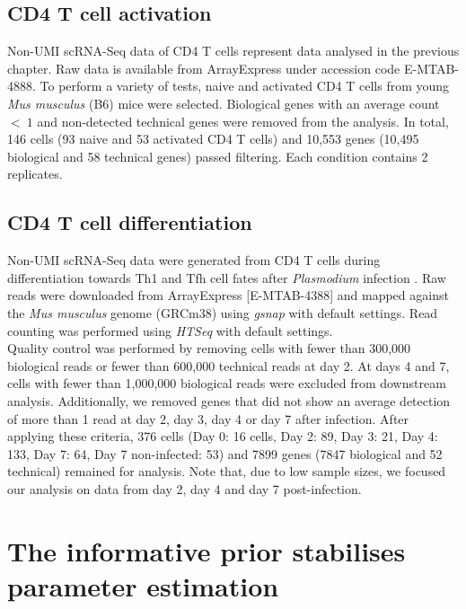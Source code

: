 \subsection{CD4\plus{} T cell activation} \label{seq::data_cd4}

Non-UMI scRNA-Seq data of CD4\plus{} T cells represent data analysed in  the previous chapter. 
Raw data is available from ArrayExpress under accession code E-MTAB-4888. To perform a variety of tests, naive and activated CD4\plus{} T cells from young \emph{Mus musculus} (B6) mice were selected. 
Biological genes with an average count $<~1$ and non-detected technical genes were removed from the analysis. 
In total, 146 cells (93 naive and 53 activated CD4\plus{} T cells) and 10,553 genes (10,495 biological and 58 technical genes) passed filtering. Each condition contains 2 replicates.

\subsection{CD4\plus{} T cell differentiation} \label{seq::data_cd4diff}

Non-UMI scRNA-Seq data were generated from CD4\plus{} T cells during differentiation towards Th1 and Tfh cell fates after \emph{Plasmodium} infection \citep{Lonnberg2017}. 
Raw reads were downloaded from ArrayExpress [E-MTAB-4388] and mapped against the \emph{Mus musculus} genome (GRCm38) using \emph{gsnap} \citep{Wu2010a} with default settings. 
Read counting was performed using \emph{HTSeq} \citep{Anders2014} with default settings. \\

Quality control was performed by removing cells with fewer than 300,000 biological reads or fewer than 600,000 technical reads at day 2. 
At days 4 and 7, cells with fewer than 1,000,000 biological reads were excluded from downstream analysis. 
Additionally, we removed genes that did not show an average detection of more than 1 read at day 2, day 3, day 4 or day 7 after infection. 
After applying these criteria, 376 cells (Day 0: 16 cells, Day 2: 89, Day 3: 21, Day 4: 133, Day 7: 64, Day 7 non-infected: 53) and 7899 genes (7847 biological and 52 technical) remained for analysis. 
Note that, due to low sample sizes, we focused our analysis on data from day 2, day 4 and day 7 post-infection.

\newpage


\section{The informative prior stabilises parameter estimation}
\label{sec2:stabilization}

